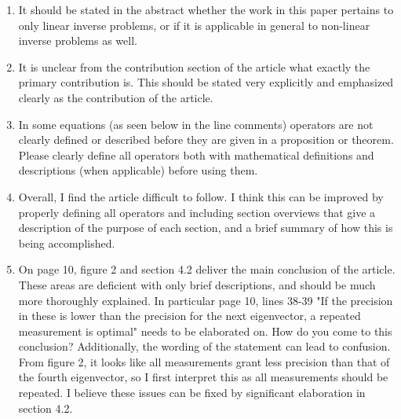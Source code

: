 \documentclass{amsart}
\begin{document}
\begin{enumerate}
\item It should be stated in the abstract whether the work in this
  paper pertains to only linear inverse problems, or if it is
  applicable in general to non-linear inverse problems as well.
  
\item It is unclear from the contribution section of the article what
exactly the primary contribution is. This should be stated very
explicitly and emphasized clearly as the contribution of the article.
  
\item In some equations (as seen below in the line comments) operators
are not clearly defined or described before they are given in a
proposition or theorem. Please clearly define all operators both with
mathematical definitions and descriptions (when applicable) before
using them.

\item Overall, I find the article difficult to follow. I think this can
be improved by properly defining all operators and including section
overviews that give a description of the purpose of each section, and
a brief summary of how this is being accomplished.


\item On page 10, figure 2 and section 4.2 deliver the main conclusion of
the article. These areas are deficient with only brief descriptions,
and should be much more thoroughly explained. In particular page 10,
lines 38-39 "If the precision in these is lower than the precision for
the next eigenvector, a repeated measurement is optimal" needs to be
elaborated on. How do you come to this conclusion? Additionally, the
wording of the statement can lead to confusion. From figure 2, it
looks like all measurements grant less precision than that of the
fourth eigenvector, so I first interpret this as all measurements
should be repeated. I believe these issues can be fixed by significant
elaboration in section 4.2.
%
\end{enumerate}
\end{document}
